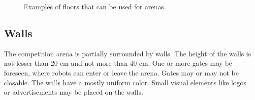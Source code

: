 \begin{figure} [h!]
\begin{center}
 \hspace{0.1cm}
 \hspace{0.1cm}
 \hspace{0.1cm}
 \hspace{0.1cm}
\end{center}
\caption{Examples of floors that can be used for \RCAW arenas.}
\label{fig:example_floors}
\end{figure}

\subsection{Walls}
The competition arena is partially surrounded by walls. The height of the walls is not lesser than 20 cm and not more than 40 cm. One or more gates may be foreseen, where robots can enter or leave the arena. Gates may or may not be closable. The walls have a mostly uniform color. Small visual elements like logos or advertisements may be placed on the walls.

